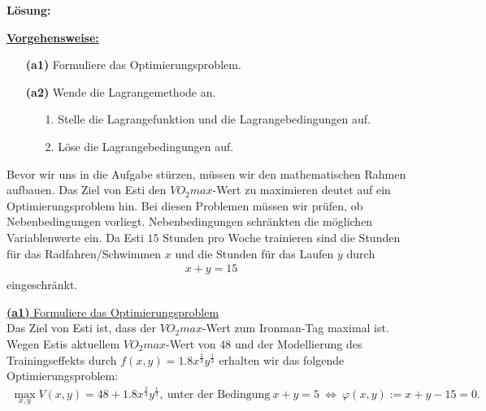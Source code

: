\textbf{Lösung:}
\begin{mdframed}
\underline{\textbf{Vorgehensweise:}}
\renewcommand{\labelenumi}{\theenumi.}
\begin{enumerate}
\item[\textbf{(a1)}] Formuliere das Optimierungsproblem.
\item[\textbf{(a2)}] Wende die Lagrangemethode an.
\begin{enumerate}
	\item[1.] Stelle die Lagrangefunktion und die Lagrangebedingungen auf. 
	\item[2.] Löse die Lagrangebedingungen auf.
\end{enumerate}
\end{enumerate}
\end{mdframed}
Bevor wir uns in die Aufgabe stürzen, müssen wir den mathematischen Rahmen aufbauen.
Das Ziel von Esti den $VO_2max$-Wert zu maximieren deutet auf ein Optimierungsproblem hin. Bei diesen Problemen müssen wir prüfen, ob Nebenbedingungen vorliegt. Nebenbedingungen schränkten die möglichen Variablenwerte ein.
Da Esti $15$ Stunden pro Woche trainieren sind die Stunden für das Radfahren/Schwimmen $x$ und die Stunden für das Laufen $y$ durch
\begin{align*}
	x + y = 15
\end{align*} 
eingeschränkt.
\newpage

\underline{\textbf{(a1)} Formuliere das Optimierungsproblem }\\
Das Ziel von Esti ist, dass der $VO_2max$-Wert zum Ironman-Tag maximal ist.
Wegen Estis aktuellem $VO_2max$-Wert von $48$ und der Modellierung des Trainingseffekts durch $f(x,y) = 1.8 x^{\frac{2}{3}} y^{\frac{1}{3}}$ erhalten wir das folgende Optimierungsproblem:
\begin{align*}
	\max_{x,y} V(x,y)
	=
	48 + 1.8 x^{\frac{2}{3}} y^{\frac{1}{3}},
	\ \text{unter der Bedingung} \ x + y = 5 \ \Leftrightarrow \ \varphi(x,y) := x + y - 15 = 0.
\end{align*}


